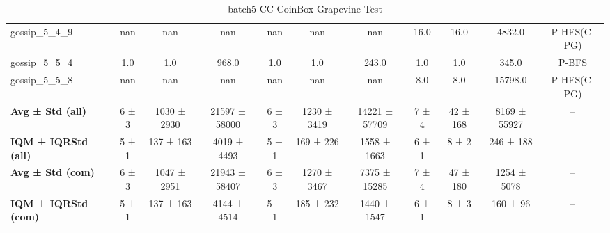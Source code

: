 \begin{table}[!ht]
\begin{tabular}{l|ccc|ccc|cccc}
gossip\_5\_4\_9 & nan & nan & nan & nan & nan & nan & 16.0 & 16.0 & 4832.0 & P-HFS(C-PG) \\
gossip\_5\_5\_4 & 1.0 & 1.0 & 968.0 & 1.0 & 1.0 & 243.0 & 1.0 & 1.0 & 345.0 & P-BFS \\
gossip\_5\_5\_8 & nan & nan & nan & nan & nan & nan & 8.0 & 8.0 & 15798.0 & P-HFS(C-PG) \\
\hline
\textbf{Avg ± Std (all)} & 6 ± 3 & 1030 ± 2930 & 21597 ± 58000 & 6 ± 3 & 1230 ± 3419 & 14221 ± 57709 & 7 ± 4 & 42 ± 168 & 8169 ± 55927 & -- \\
\textbf{IQM ± IQRStd (all)} & 5 ± 1 & 137 ± 163 & 4019 ± 4493 & 5 ± 1 & 169 ± 226 & 1558 ± 1663 & 6 ± 1 & 8 ± 2 & 246 ± 188 & -- \\
\textbf{Avg ± Std (com)} & 6 ± 3 & 1047 ± 2951 & 21943 ± 58407 & 6 ± 3 & 1270 ± 3467 & 7375 ± 15285 & 7 ± 4 & 47 ± 180 & 1254 ± 5078 & -- \\
\textbf{IQM ± IQRStd (com)} & 5 ± 1 & 137 ± 163 & 4144 ± 4514 & 5 ± 1 & 185 ± 232 & 1440 ± 1547 & 6 ± 1 & 8 ± 3 & 160 ± 96 & -- \\
\end{tabular}
\caption{batch5-CC-CoinBox-Grapevine-Test}
\label{tab:batch5_CC-CoinBox-Grapevine_comparison_test}
\end{table}

